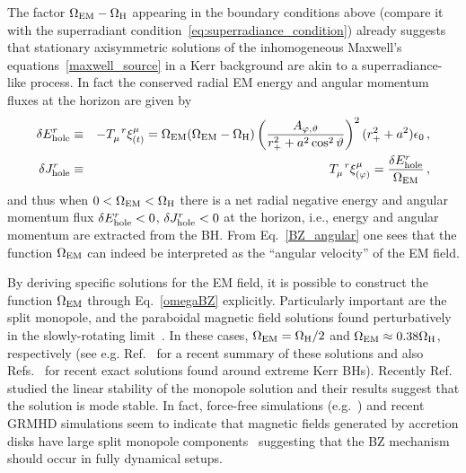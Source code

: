 \documentclass[11pt]{article}
\def\beq{\begin{eqnarray}}
\def\eeq{\end{eqnarray}}
\numberwithin{equation}{section} %
\begin{document}
The factor $\Omega_{\rm EM}-\Omega_{\rm H}$ appearing in the boundary conditions above (compare it with the 
superradiant 
condition~\eqref{eq:superradiance_condition}) already suggests that stationary axisymmetric solutions of the 
inhomogeneous Maxwell's equations~\eqref{maxwell_source} in a Kerr background are akin to a superradiance-like process. 
In fact the conserved radial EM energy and angular momentum fluxes at the horizon are given by~\cite{Blandford:1977ds}
%
\beq
\delta E_{\rm hole}^r&\equiv&-T_{\mu}^{\phantom{\mu}r}\xi^{\mu}_{(t)}=\Omega_{\rm EM}(\Omega_{\rm EM}-\Omega_{\rm 
H})\left(\frac{A_{\varphi,\vartheta}}{r_+^2+a^2\cos^2\vartheta}\right)^2(r_+^2+a^2)\epsilon_0\,,\label{BZ_energy}\\
\delta J_{\rm hole}^r&\equiv&T_{\mu}^{\phantom{\mu}r}\xi^{\mu}_{(\varphi)}=\frac{\delta E_{\rm hole}^r}{\Omega_{\rm 
EM}}\,,\label{BZ_angular}
\eeq
%
and thus when $0<\Omega_{\rm EM}<\Omega_{\rm H}$ there is a net radial negative energy and angular momentum flux 
$\delta 
E_{\rm hole}^r<0$, $\delta J_{\rm hole}^r<0$  at the horizon, i.e., energy and angular momentum are extracted from the 
BH. From Eq.~\eqref{BZ_angular} one sees that the function $\Omega_{\rm EM}$ can indeed be interpreted as the ``angular 
velocity'' of the EM field.

By deriving specific solutions for the EM field, it is possible to construct the function $\Omega_{\rm EM}$ through 
Eq.~\eqref{omegaBZ} explicitly. Particularly important are the split monopole, and the paraboidal magnetic field 
solutions found perturbatively in the slowly-rotating limit~\cite{Blandford:1977ds}. In these cases, $\Omega_{\rm 
EM}=\Omega_{\rm H}/2$ and $\Omega_{\rm EM}\approx 0.38\Omega_{\rm H}$, respectively (see e.g. 
Ref.~\cite{Gralla:2014yja} 
for a recent summary of these solutions and also 
Refs.~\cite{Lupsasca:2014pfa,Lupsasca:2014hua,Zhang:2014pla,Li:2014bta} 
for recent exact solutions found around extreme Kerr BHs). Recently Ref.~\cite{Yang:2014zva} studied the linear 
stability of the monopole solution and their results suggest that the solution is mode stable. 
In fact, force-free simulations 
(e.g.~\cite{Komissarov:2004ms,Komissarov:2008yh,McKinney:2006sc,Tchekhovskoy:2008gq,Palenzuela:2010xn}) and recent GRMHD 
simulations seem to indicate that magnetic fields generated by accretion disks have large split monopole 
components~\cite{Tchekhovskoy:2012up,McKinney:2012vh,Penna:2013rga} suggesting that the BZ mechanism should occur in 
fully dynamical setups. 

\end{document}
